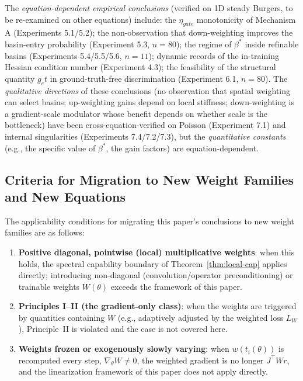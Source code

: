 \documentclass[11pt]{article}
\newcommand{\W}{W}
\numberwithin{equation}{section}
\begin{document}
The \emph{equation-dependent empirical conclusions} (verified on 1D steady Burgers, to be re-examined on other equations) include: the $\eta_{gate}$ monotonicity of Mechanism A (Experiments 5.1/5.2); the non-observation that down-weighting improves the basin-entry probability (Experiment 5.3, $n=80$); the regime of $\beta^*$ inside refinable basins (Experiments 5.4/5.5/5.6, $n=11$); dynamic records of the in-training Hessian condition number (Experiment 4.3); the feasibility of the structural quantity $g_et$ in ground-truth-free discrimination (Experiment 6.1, $n=80$). The \emph{qualitative directions} of these conclusions (no observation that spatial weighting can select basins; up-weighting gains depend on local stiffness; down-weighting is a gradient-scale modulator whose benefit depends on whether scale is the bottleneck) have been cross-equation-verified on Poisson (Experiment 7.1) and internal singularities (Experiments 7.4/7.2/7.3), but the \emph{quantitative constants} (e.g., the specific value of $\beta^*$, the gain factors) are equation-dependent.

\subsection{Criteria for Migration to New Weight Families and New Equations}\label{sec:migration}

The applicability conditions for migrating this paper's conclusions to new weight families are as follows:
\begin{enumerate}[label=(\arabic*),leftmargin=2em,itemsep=1pt]
\item \textbf{Positive diagonal, pointwise (local) multiplicative weights}: when this holds, the spectral capability boundary of Theorem~\ref{thm:local-cap} applies directly; introducing non-diagonal (convolution/operator preconditioning) or trainable weights $\W(\theta)$ exceeds the framework of this paper.
\item \textbf{Principles I--II (the gradient-only class)}: when the weights are triggered by quantities containing $\W$ (e.g., adaptively adjusted by the weighted loss $L_\W$), Principle~II is violated and the case is not covered here.
\item \textbf{Weights frozen or exogenously slowly varying}: when $w(t_i(\theta))$ is recomputed every step, $\nabla_\theta\W\ne0$, the weighted gradient is no longer $J^\top\W r$, and the linearization framework of this paper does not apply directly.
\end{enumerate}
\end{document}
